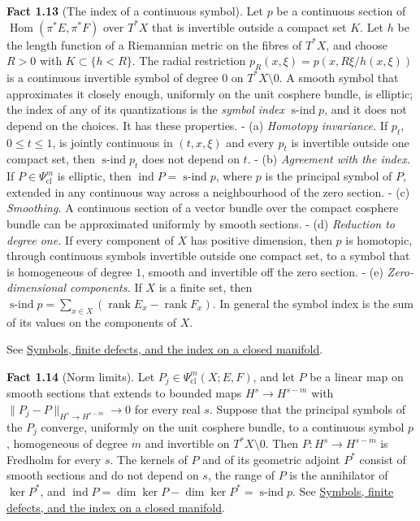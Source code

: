 \documentclass[
  11pt,
]{article}
\begin{document}
\textbf{Fact 1.13} (The index of a continuous symbol). Let \(p\) be a
continuous section of \(\operatorname{Hom}(\pi^*E,\pi^*F)\) over
\(T^*X\) that is invertible outside a compact set \(K\). Let \(h\) be
the length function of a Riemannian metric on the fibres of \(T^*X\),
and choose \(R>0\) with \(K\subset\{h<R\}\). The radial restriction
\(p_R(x,\xi)=p(x,R\xi/h(x,\xi))\) is a continuous invertible symbol of
degree \(0\) on \(T^*X\setminus0\). A smooth symbol that approximates it
closely enough, uniformly on the unit cosphere bundle, is elliptic; the
index of any of its quantizations is the \emph{symbol index}
\(\operatorname{s-ind}p\), and it does not depend on the choices. It has
these properties. - (a) \emph{Homotopy invariance.} If \(p_t\),
\(0\le t\le1\), is jointly continuous in \((t,x,\xi)\) and every \(p_t\)
is invertible outside one compact set, then \(\operatorname{s-ind}p_t\)
does not depend on \(t\). - (b) \emph{Agreement with the index.} If
\(P\in\Psi^m_{\mathrm{cl}}\) is elliptic, then
\(\operatorname{ind}P=\operatorname{s-ind}p\), where \(p\) is the
principal symbol of \(P\), extended in any continuous way across a
neighbourhood of the zero section. - (c) \emph{Smoothing.} A continuous
section of a vector bundle over the compact cosphere bundle can be
approximated uniformly by smooth sections. - (d) \emph{Reduction to
degree one.} If every component of \(X\) has positive dimension, then
\(p\) is homotopic, through continuous symbols invertible outside one
compact set, to a symbol that is homogeneous of degree \(1\), smooth and
invertible off the zero section. - (e) \emph{Zero-dimensional
components.} If \(X\) is a finite set, then
\(\operatorname{s-ind}p=\sum_{x\in X}(\operatorname{rank}E_x-\operatorname{rank}F_x)\).
In general the symbol index is the sum of its values on the components
of \(X\).

See \href{global-elliptic-symbol-index.pdf}{Symbols, finite defects, and
the index on a closed manifold}.

\textbf{Fact 1.14} (Norm limits). Let
\(P_j\in\Psi^m_{\mathrm{cl}}(X;E,F)\), and let \(P\) be a linear map on
smooth sections that extends to bounded maps \(H^s\to H^{s-m}\) with
\(\|P_j-P\|_{H^s\to H^{s-m}}\to0\) for every real \(s\). Suppose that
the principal symbols of the \(P_j\) converge, uniformly on the unit
cosphere bundle, to a continuous symbol \(p\), homogeneous of degree
\(m\) and invertible on \(T^*X\setminus0\). Then \(P:H^s\to H^{s-m}\) is
Fredholm for every \(s\). The kernels of \(P\) and of its geometric
adjoint \(P^*\) consist of smooth sections and do not depend on \(s\),
the range of \(P\) is the annihilator of \(\ker P^*\), and
\(\operatorname{ind}P=\dim\ker P-\dim\ker P^*=\operatorname{s-ind}p\).
See \href{global-elliptic-symbol-index.pdf}{Symbols, finite defects, and
the index on a closed manifold}.
\end{document}
